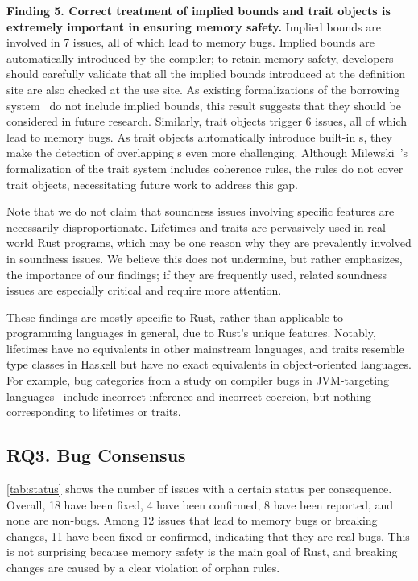 {\bf Finding 5. Correct treatment of implied bounds and trait objects is
extremely important in ensuring memory safety.}
%
Implied bounds are involved in 7 issues, all of which lead to memory bugs.
%
Implied bounds are automatically introduced by the compiler;
%
to retain memory safety, \rustc{} developers should carefully validate that all
the implied bounds introduced at the definition site are also checked at the use
site.
%
As existing formalizations of the borrowing system~\cite{jung2017rustbelt,
wagner2025linearity} do not include implied bounds, this result suggests that
they should be considered in future research.
%
Similarly, trait objects trigger 6 issues, all of which lead to memory bugs.
%
As trait objects automatically introduce built-in s, they make the
detection of overlapping s even more challenging.
%
Although Milewski~\cite{milewski2015traits}'s formalization of the trait system
includes coherence rules, the rules do not cover trait objects, necessitating
future work to address this gap.

Note that we do not claim that soundness issues involving specific features are
necessarily disproportionate.
%
Lifetimes and traits are pervasively used in real-world Rust programs, which may
be one reason why they are prevalently involved in soundness issues.
%
We believe this does not undermine, but rather emphasizes, the importance of our
findings;
%
if they are frequently used, related soundness issues are especially critical
and require more attention.

These findings are mostly specific to Rust, rather than applicable to
programming languages in general, due to Rust's unique features.
%
Notably, lifetimes have no equivalents in other mainstream languages, and traits
resemble type classes in Haskell but have no exact equivalents in
object-oriented languages.
%
For example, bug categories from a study on compiler bugs in JVM-targeting
languages~\cite{chaliasos2021jvm} include incorrect inference and incorrect
coercion, but nothing corresponding to lifetimes or traits.

\subsection{RQ3. Bug Consensus}

\cref{tab:status} shows the number of issues with a certain status per
consequence.
%
Overall, 18 have been fixed, 4 have been confirmed, 8 have been reported, and
none are non-bugs.
%
Among 12 issues that lead to memory bugs or breaking changes, 11 have been fixed
or confirmed, indicating that they are real bugs.
%
This is not surprising because memory safety is the main goal of Rust, and
breaking changes are caused by a clear violation of orphan rules.

